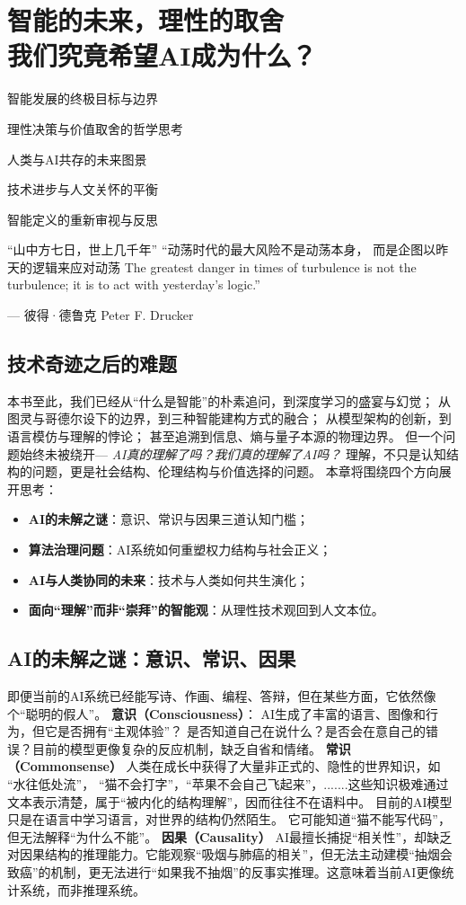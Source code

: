 \chapter{智能的未来，理性的取舍\texorpdfstring{\\}{ }我们究竟希望AI成为什么？}
 \begin{introduction}
  \item 智能发展的终极目标与边界
  \item 理性决策与价值取舍的哲学思考
  \item 人类与AI共存的未来图景
  \item 技术进步与人文关怀的平衡
  \item 智能定义的重新审视与反思
\end{introduction}
“山中方七日，世上几千年”
“动荡时代的最大风险不是动荡本身， 而是企图以昨天的逻辑来应对动荡
The greatest danger in times of turbulence is not the turbulence; it is to act with yesterday’s logic.”
\begin{flushright}
— 彼得·德鲁克 Peter F. Drucker
\end{flushright}
\section*{技术奇迹之后的难题}
本书至此，我们已经从“什么是智能”的朴素追问，到深度学习的盛宴与幻觉；
从图灵与哥德尔设下的边界，到三种智能建构方式的融合；
从模型架构的创新，到语言模仿与理解的悖论；
甚至追溯到信息、熵与量子本源的物理边界。
但一个问题始终未被绕开--- \textit{AI真的理解了吗？我们真的理解了AI吗？}
理解，不只是认知结构的问题，更是社会结构、伦理结构与价值选择的问题。
本章将围绕四个方向展开思考：
\begin{itemize}
\item \textbf{AI的未解之谜}：意识、常识与因果三道认知门槛；
\item \textbf{算法治理问题}：AI系统如何重塑权力结构与社会正义；
\item \textbf{AI与人类协同的未来}：技术与人类如何共生演化；
\item \textbf{面向“理解”而非“崇拜”的智能观}：从理性技术观回到人文本位。
\end{itemize}
\section{AI的未解之谜：意识、常识、因果}
即便当前的AI系统已经能写诗、作画、编程、答辩，但在某些方面，它依然像个“聪明的假人”。
\textbf{意识（Consciousness）}：
AI生成了丰富的语言、图像和行为，但它是否拥有“主观体验”？
是否知道自己在说什么？是否会在意自己的错误？目前的模型更像复杂的反应机制，缺乏自省和情绪。
\textbf{常识（Commonsense）}
人类在成长中获得了大量非正式的、隐性的世界知识，如 “水往低处流”， “猫不会打字”，“苹果不会自己飞起来”，.......这些知识极难通过文本表示清楚，属于“被内化的结构理解”，因而往往不在语料中。
目前的AI模型只是在语言中学习语言，对世界的结构仍然陌生。 它可能知道“猫不能写代码”，但无法解释“为什么不能”。
\textbf{因果（Causality）}
AI最擅长捕捉“相关性”，却缺乏对因果结构的推理能力。它能观察“吸烟与肺癌的相关”，但无法主动建模“抽烟会致癌”的机制，更无法进行“如果我不抽烟”的反事实推理。这意味着当前AI更像统计系统，而非推理系统。
